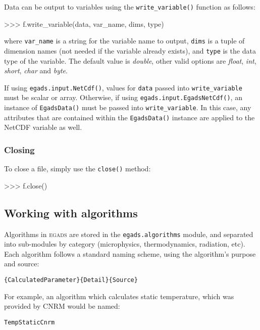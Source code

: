 \documentclass[a4paper,11pt]{report}
\newcommand{\egads}{\textsc{egads} }
\begin{document}
Data can be output to variables using the \verb|write_variable()| function as follows:

\begin{command}
    >>> f.write_variable(data, var_name, dims, type)
\end{command}

where \verb|var_name| is a string for the variable name to output, \verb|dims| is a tuple 
of dimension names (not needed if the variable already exists), and \verb|type| is the 
data type of the variable. The default value is \textit{double}, other valid options 
are \textit{float}, \textit{int}, \textit{short}, \textit{char} and \textit{byte}. 

If using \verb|egads.input.NetCdf()|, values for \verb|data| passed into \verb|write_variable| 
must be scalar or array. Otherwise, if using \verb|egads.input.EgadsNetCdf()|, an instance 
of \verb|EgadsData()| must be passed into \verb|write_variable|. In this case, any attributes 
that are contained within the \verb|EgadsData()| instance are applied to the NetCDF variable as well.

\subsubsection{Closing}

To close a file, simply use the \verb|close()| method:

\begin{command}
    >>> f.close()
\end{command}

\subsection{Working with algorithms}

Algorithms in \egads are stored in the \verb|egads.algorithms| module, and separated into sub-modules
by category (microphysics, thermodynamics, radiation, etc). Each algorithm follows a standard naming 
scheme, using the algorithm's purpose and source:

\begin{verbatim} 
{CalculatedParameter}{Detail}{Source}
\end{verbatim}

For example, an algorithm which calculates static temperature, which was provided by CNRM would be
named:

\begin{verbatim}
TempStaticCnrm
\end{verbatim}
\end{document}
